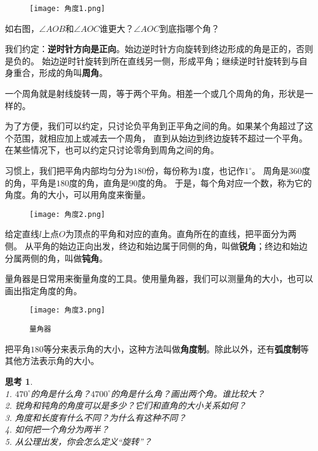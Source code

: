 \documentclass[12pt,UTF8]{ctexbook}
\newtheorem{sk}{思考}[section]
\begin{document}
\begin{wrapfigure}{r}{0.3\textwidth} %
    \vspace{-15pt}
    \flushright
    \texttt{[image: 角度1.png]}
\end{wrapfigure}

如右图，$\angle AOB$和$\angle AOC$谁更大？$\angle AOC$到底指哪个角？

我们约定：\textbf{逆时针方向是正向}。始边逆时针方向旋转到终边形成的角是正的，否则是负的。
始边逆时针旋转到所在直线另一侧，形成平角；继续逆时针旋转到与自身重合，形成的角叫\textbf{周角}。

一个周角就是射线旋转一周，等于两个平角。相差一个或几个周角的角，形状是一样的。

为了方便，我们可以约定，只讨论负平角到正平角之间的角。如果某个角超过了这个范围，就相应加上或减去一个周角，
直到从始边到终边旋转不超过一个平角。在某些情况下，也可以约定只讨论零角到周角之间的角。

习惯上，我们把平角内部均匀分为$180$份，每份称为$1$度，也记作$1^\circ$。
周角是$360$度的角，平角是$180$度的角，直角是$90$度的角。
于是，每个角对应一个数，称为它的角度。角的大小，可以用角度来衡量。

\begin{wrapfigure}{r}{0.3\textwidth} %
    \vspace{-5pt}     
    \flushright
    \texttt{[image: 角度2.png]}
\end{wrapfigure}

给定直线$l$上点$O$为顶点的平角和对应的直角。直角所在的直线，把平面分为两侧。
从平角的始边正向出发，终边和始边属于同侧的角，叫做\textbf{锐角}；终边和始边分属两侧的角，叫做\textbf{钝角}。

量角器是日常用来衡量角度的工具。使用量角器，我们可以测量角的大小，也可以画出指定角度的角。

\begin{wrapfigure}{l}{0.4\textwidth} %
    \vspace{-5pt}     
    \flushleft
    \texttt{[image: 角度3.png]}
    \caption*{\texttt{量角器\;\;\;\;\;}}
\end{wrapfigure}

把平角$180$等分来表示角的大小，这种方法叫做\textbf{角度制}。除此以外，还有\textbf{弧度制}等其他方法表示角的大小。

\begin{sk}\label{sk:0-2-0}
    \mbox{}\\
    1. $470^\circ$的角是什么角？$4700^\circ$的角是什么角？画出两个角。谁比较大？\\
    2. 锐角和钝角的角度可以是多少？它们和直角的大小关系如何？\\
    3. 角度和长度有什么不同？为什么有这种不同？\\
    4. 如何把一个角分为两半？\\
    5. 从公理出发，你会怎么定义“旋转”？
\end{sk}
\end{document}
